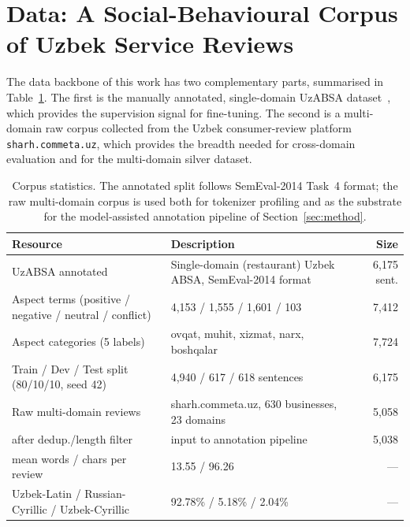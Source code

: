 \documentclass[runningheads]{llncs}
\begin{document}
\section{Data: A Social-Behavioural Corpus of Uzbek Service Reviews}
\label{sec:data}

The data backbone of this work has two complementary parts, summarised in
Table~\ref{tab:corpus}. The first is the manually annotated, single-domain
UzABSA dataset~\cite{matlatipov2024uzabsa}, which provides the supervision
signal for fine-tuning. The second is a multi-domain raw corpus collected
from the Uzbek consumer-review platform \texttt{sharh.commeta.uz}, which
provides the breadth needed for cross-domain evaluation and for the
multi-domain silver dataset.

\begin{table}[!htbp]
\centering
\caption{Corpus statistics. The annotated split follows SemEval-2014 Task~4
format; the raw multi-domain corpus is used both for tokenizer profiling and
as the substrate for the model-assisted annotation pipeline of
Section~\ref{sec:method}.}
\label{tab:corpus}
\renewcommand{\arraystretch}{1.1}
\setlength{\tabcolsep}{6pt}
\begin{tabularx}{\textwidth}{l X r}
\toprule
\textbf{Resource} & \textbf{Description} & \textbf{Size} \\
\midrule
UzABSA annotated~\cite{matlatipov2024uzabsa} & Single-domain (restaurant) Uzbek ABSA, SemEval-2014 format & 6{,}175 sent. \\
\quad Aspect terms (positive / negative / neutral / conflict) & 4{,}153 / 1{,}555 / 1{,}601 / 103 & 7{,}412 \\
\quad Aspect categories (5 labels) & ovqat, muhit, xizmat, narx, boshqalar & 7{,}724 \\
Train / Dev / Test split (80/10/10, seed 42) & 4{,}940 / 617 / 618 sentences & 6{,}175 \\
\midrule
Raw multi-domain reviews & sharh.commeta.uz, 630 businesses, 23 domains & 5{,}058 \\
\quad after dedup./length filter & input to annotation pipeline & 5{,}038 \\
\quad mean words / chars per review & 13.55 / 96.26 & --- \\
\quad Uzbek-Latin / Russian-Cyrillic / Uzbek-Cyrillic & 92.78\% / 5.18\% / 2.04\% & --- \\
\bottomrule
\end{tabularx}
\end{table}
\end{document}
